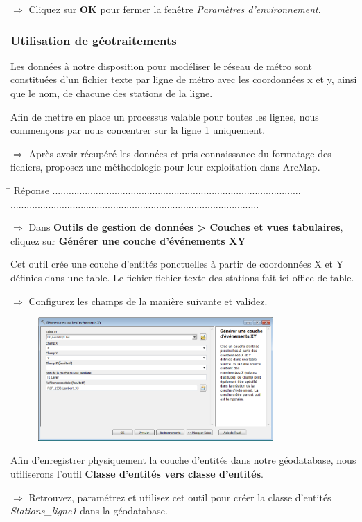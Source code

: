 \documentclass[11pt]{article}
\newcommand{\action}{$\Rightarrow$ }
\newcommand{\reponse}{
	\begin{tabbing}
	\hspace{2cm}\=\kill
	Réponse \> ............................................................................................ \\
 	\> ............................................................................................
	\end{tabbing}
}
\begin{document}
\action Cliquez sur \textbf{OK} pour fermer la fenêtre \textit{Paramètres d'environnement}.


\subsubsection{Utilisation de géotraitements}
Les données à notre disposition pour modéliser le réseau de métro sont constituées d'un fichier texte par ligne de métro avec les coordonnées x et y, ainsi que le nom, de chacune des stations de la ligne.

Afin de mettre en place un processus valable pour toutes les lignes, nous commençons par nous concentrer sur la ligne 1 uniquement.

\action Après avoir récupéré les données et pris connaissance du formatage des fichiers, proposez une méthodologie pour leur exploitation dans ArcMap.

\reponse

\action Dans \textbf{Outils de gestion de données > Couches et vues tabulaires}, cliquez sur \textbf{Générer une couche d'événements XY}

Cet outil crée une couche d'entités ponctuelles à partir de coordonnées X et Y définies dans une table. Le fichier fichier texte des stations fait ici office de table.

\action Configurez les champs de la manière suivante et validez.
\begin{figure}[H]
	\center \includegraphics[width=0.8\textwidth]{img/td3/toolbox_generer_xy.png}\\
\end{figure}

Afin d'enregistrer physiquement la couche d'entités dans notre géodatabase, nous utiliserons l'outil \textbf{Classe d'entités vers classe d'entités}.

\action Retrouvez, paramétrez et utilisez cet outil pour créer la classe d'entités \textit{Stations\_ligne1} dans la géodatabase.
\end{document}
